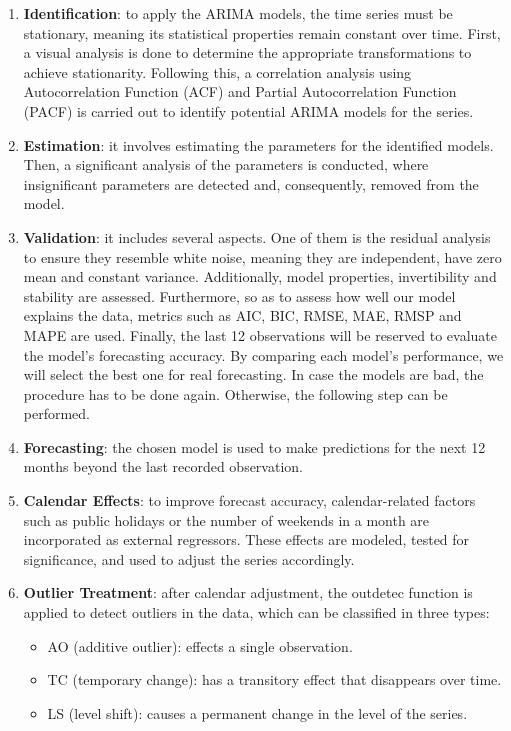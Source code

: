 \documentclass[
]{article}
\begin{document}
\begin{enumerate}
\def\labelenumi{\arabic{enumi}.}
\item
  \textbf{Identification}: to apply the ARIMA models, the time series
  must be stationary, meaning its statistical properties remain constant
  over time. First, a visual analysis is done to determine the
  appropriate transformations to achieve stationarity. Following this, a
  correlation analysis using Autocorrelation Function (ACF) and Partial
  Autocorrelation Function (PACF) is carried out to identify potential
  ARIMA models for the series.
\item
  \textbf{Estimation}: it involves estimating the parameters for the
  identified models. Then, a significant analysis of the parameters is
  conducted, where insignificant parameters are detected and,
  consequently, removed from the model.
\item
  \textbf{Validation}: it includes several aspects. One of them is the
  residual analysis to ensure they resemble white noise, meaning they
  are independent, have zero mean and constant variance. Additionally,
  model properties, invertibility and stability are assessed.
  Furthermore, so as to assess how well our model explains the data,
  metrics such as AIC, BIC, RMSE, MAE, RMSP and MAPE are used. Finally,
  the last 12 observations will be reserved to evaluate the model's
  forecasting accuracy. By comparing each model's performance, we will
  select the best one for real forecasting. In case the models are bad,
  the procedure has to be done again. Otherwise, the following step can
  be performed.
\item
  \textbf{Forecasting}: the chosen model is used to make predictions for
  the next 12 months beyond the last recorded observation.
\item
  \textbf{Calendar Effects}: to improve forecast accuracy,
  calendar-related factors such as public holidays or the number of
  weekends in a month are incorporated as external regressors. These
  effects are modeled, tested for significance, and used to adjust the
  series accordingly.
\item
  \textbf{Outlier Treatment}: after calendar adjustment, the outdetec
  function is applied to detect outliers in the data, which can be
  classified in three types:

  \begin{itemize}
  \item
    AO (additive outlier): effects a single observation.
  \item
    TC (temporary change): has a transitory effect that disappears over
    time.
  \item
    LS (level shift): causes a permanent change in the level of the
    series.
  \end{itemize}
\end{enumerate}
\end{document}
